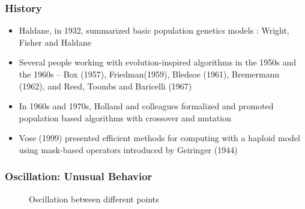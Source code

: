 \documentclass[aspectratio=169]{beamer}
\begin{document}
  \begin{frame}
    \frametitle{History}
    \begin{itemize}
      \item{Haldane, in 1932, summarized basic population genetics  models : Wright, Fisher and Haldane}
      \item{Several people working with evolution-inspired algorithms in the 1950s and the 1960s –  
      Box (1957), Friedman(1959), Bledsoe (1961), Bremermann (1962), and Reed, Toombs and Baricelli (1967) }
      \item{In 1960s and 1970s, Holland and colleagues formalized  and promoted population based algorithms with crossover and mutation }
      \item{Vose (1999) presented efficient methods for computing with a haploid model using mask-based operators introduced by Geiringer (1944)}
    \end{itemize}
  \end{frame}
  
  \begin{frame}
    \frametitle{Oscillation: Unusual Behavior}
    \begin{figure}[h]
      \begin{center}
	\caption{Oscillation between different points}	
      \end{center}
    \end{figure}
  \end{frame}
  
\end{document}
